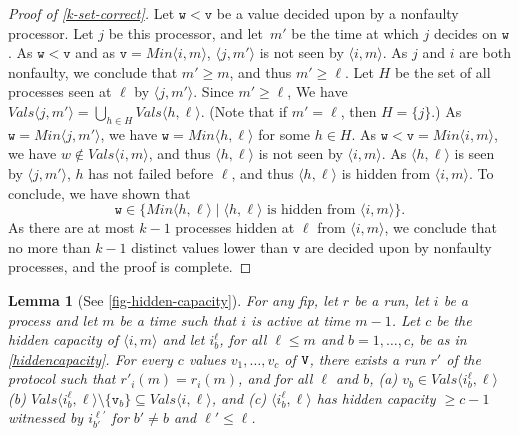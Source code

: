\documentclass[11pt]{article}
\newtheorem{lemma}{Lemma}
\theoremstyle{definition}
\newcommand{\minval}[1]{\ensuremath{\mathit{Min}\node{#1}}}
\newcommand{\knownvals}[1]{\ensuremath{\mathit{Vals}\node{#1}}}
\newcommand{\set}[1]{\{#1\}}
\newcommand{\Vals}{{\tt V}}
\newcommand{\node}[1]{\langle#1\rangle}
\begin{document}
\begin{proof}[Proof of \cref{k-set-correct}]
Let $\mathtt{w}<\mathtt{v}$ be a value decided upon by a nonfaulty processor.
Let $j$ be this processor, and let~$m'$ be the time at which $j$ decides on $\mathtt{w}$.
As $\mathtt{w}<\mathtt{v}$ and as $\mathtt{v} = \minval{i,m}$, $\node{j,m'}$ is not seen
by $\node{i,m}$.
As $j$ and $i$ are both nonfaulty, we conclude that $m' \ge m$, and thus
$m' \ge \ell$.
Let $H$ be the set of all processes seen at $\ell$ by $\node{j,m'}$.
Since $m' \ge \ell$,
We have $\knownvals{j,m'} = \bigcup_{h \in H} \knownvals{h,\ell}$. (Note
that if $m' = \ell$, then $H = \set{j}$.)
As $\mathtt{w} = \minval{j,m'}$, we have $\mathtt{w} = \minval{h,\ell}$ for
some $h \in H$. As $\mathtt{w} < \mathtt{v} = \minval{i,m}$, we have
$w \notin \knownvals{i,m}$, and thus $\node{h,\ell}$ is not seen
by $\node{i,m}$. As $\node{h,\ell}$ is seen by $\node{j,m'}$, $h$ has not failed
before $\ell$, and thus $\node{h,\ell}$ is hidden from $\node{i,m}$.
To conclude, we have shown that
\[\mathtt{w} \in \bigl\{ \minval{h,\ell} \mid
\mbox{$\node{h,\ell}$ is hidden from $\node{i,m}$} \bigr\}.\]
As there are at most $k-1$ processes hidden at $\ell$ from $\node{i,m}$,
we conclude that no more than $k-1$ distinct values lower than $\mathtt{v}$ are
decided upon by nonfaulty processes, and the proof is complete.
\end{proof}

\begin{lemma}[See \cref{fig-hidden-capacity}]\label{exist-hidden-channels}
For any fip,
let $r$ be a run, let $i$ be a process and let $m$ be a time such that
$i$ is active at time $m-1$.
Let $c$ be the hidden capacity of $\node{i,m}$ and
let $i_b^{\ell}$, for all $\ell\le m$ and $b=1,\ldots,c$,
be as in \cref{hiddencapacity}.
For every $c$ values $v_1,\ldots,v_c$ of $\Vals$, there exists a run $r'$ of the protocol
such that  $r'_i(m)=r_i(m)$,
and for all $\ell$ and $b$, (a)
$v_b \in \knownvals{i_b^{\ell}, \ell}$
(b) $\knownvals{i_b^{\ell},\ell} \setminus \set{\mathtt{v}_b} \subseteq \knownvals{i,\ell}$,
and (c) $\node{i_b^{\ell},\ell}$
has hidden capacity $\ge c-1$ witnessed by
$i_{b'}^{\ell'}$ for $b'\ne b$ and $\ell'\le \ell$.
\end{lemma}
\end{document}
